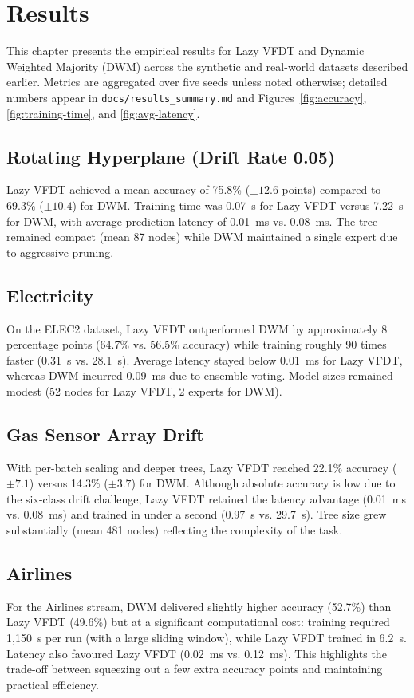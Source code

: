 \cleardoublepage
\chapter{Results}
\label{chap:results}

This chapter presents the empirical results for Lazy VFDT and Dynamic Weighted Majority (DWM) across the synthetic and real-world datasets described earlier. Metrics are aggregated over five seeds unless noted otherwise; detailed numbers appear in \texttt{docs/results\_summary.md} and Figures~\ref{fig:accuracy}, \ref{fig:training-time}, and \ref{fig:avg-latency}.

\section{Rotating Hyperplane (Drift Rate 0.05)}
Lazy VFDT achieved a mean accuracy of 75.8\% (\(\pm 12.6\) points) compared to 69.3\% (\(\pm 10.4\)) for DWM. Training time was 0.07~s for Lazy VFDT versus 7.22~s for DWM, with average prediction latency of 0.01~ms vs. 0.08~ms. The tree remained compact (mean 87 nodes) while DWM maintained a single expert due to aggressive pruning.

\section{Electricity}
On the ELEC2 dataset, Lazy VFDT outperformed DWM by approximately 8 percentage points (64.7\% vs. 56.5\% accuracy) while training roughly 90 times faster (0.31~s vs. 28.1~s). Average latency stayed below 0.01~ms for Lazy VFDT, whereas DWM incurred 0.09~ms due to ensemble voting. Model sizes remained modest (52 nodes for Lazy VFDT, 2 experts for DWM).

\section{Gas Sensor Array Drift}
With per-batch scaling and deeper trees, Lazy VFDT reached 22.1\% accuracy (\(\pm 7.1\)) versus 14.3\% (\(\pm 3.7\)) for DWM. Although absolute accuracy is low due to the six-class drift challenge, Lazy VFDT retained the latency advantage (0.01~ms vs. 0.08~ms) and trained in under a second (0.97~s vs. 29.7~s). Tree size grew substantially (mean 481 nodes) reflecting the complexity of the task.

\section{Airlines}
For the Airlines stream, DWM delivered slightly higher accuracy (52.7\%) than Lazy VFDT (49.6\%) but at a significant computational cost: training required 1{,}150~s per run (with a large sliding window), while Lazy VFDT trained in 6.2~s. Latency also favoured Lazy VFDT (0.02~ms vs. 0.12~ms). This highlights the trade-off between squeezing out a few extra accuracy points and maintaining practical efficiency.

